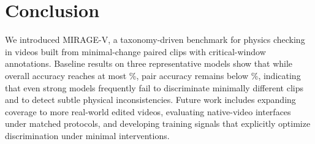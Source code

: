 \section{Conclusion}
We introduced MIRAGE-V, a taxonomy-driven benchmark for physics checking in videos built from minimal-change paired clips with critical-window annotations.
Baseline results on three representative models show that while overall accuracy reaches at most \BestAcc\%, pair accuracy remains below \BestPairAcc\%, indicating that even strong models frequently fail to discriminate minimally different clips and to detect subtle physical inconsistencies.
Future work includes expanding coverage to more real-world edited videos, evaluating native-video interfaces under matched protocols, and developing training signals that explicitly optimize discrimination under minimal interventions.
